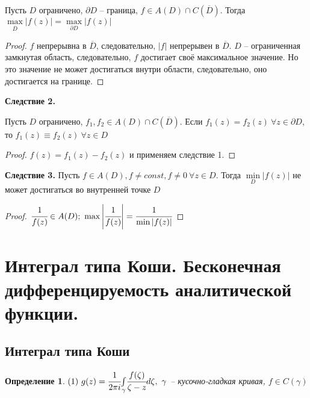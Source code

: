 \documentclass[draft]{article}
\newcommand{\dd}{\partial}
\newcommand{\mint}[2]{\underset{#1}{\overset{#2}{\int}}}
\newcommand{\mmax}[1]{\underset{#1}{\max}}
\newcommand{\mmin}[1]{\underset{#1}{\min}}
\renewcommand{\bar}{\overline}
\newcommand{\g}{\gamma}
\newcommand{\F}{\ \forall}
\newcommand{\opr}[1]{\begin{opred}#1\end{opred}}
\newtheorem*{opred}{Определение}
\theoremstyle{remark}
\begin{document}
Пусть $D$ ограничено, $\dd D$ -- граница, $f\in A(D)\cap C(\bar{D})$. Тогда $\mmax{\bar{D}}|f(z)|=\mmax{\dd D}|f(z)|$
\begin{proof}
$f$ непрерывна в $\bar{D}$, следовательно, $|f|$ непрерывен в $\bar{D}$. $D$ -- ограниченная замкнутая область, следовательно, $f$ достигает своё максимальное значение. Но это значение не может достигаться внутри области, следовательно, оно достигается на границе.
\end{proof}
{\bfseries Следствие 2.}

Пусть $D$ ограничено, $f_1,f_2\in A(D)\cap C(\bar{D})$. Если $f_1(z)=f_2(z)\F z\in\dd D$, то $f_1(z)\equiv f_2(z)\F z\in D$
\begin{proof}
$f(z)=f_1(z)-f_2(z)$ и применяем следствие 1.
\end{proof}
{\bfseries Следствие 3.}
Пусть $f\in  A(D),f\neq const,f\neq 0\F z\in D$. Тогда $\mmin{D}|f(z)|$ не может достигаться во внутренней точке $D$
\begin{proof}
$\cfrac{1}{f(z)}\in A(D);\ \max\left|\cfrac{1}{f(z)}\right|=\cfrac{1}{\min|f(z)|}$
\end{proof}

\newpage

\section{Интеграл типа Коши. Бесконечная дифференцируемость аналитической функции.}

\subsection{Интеграл типа Коши}

\opr{$(1)\ g(z)=\cfrac 1{2\pi i}\mint{\g}{}\cfrac{f(\zeta)}{\zeta-z}d\zeta,\ \g$ -- кусочно-гладкая кривая, $f\in C(\g)$}
\end{document}

